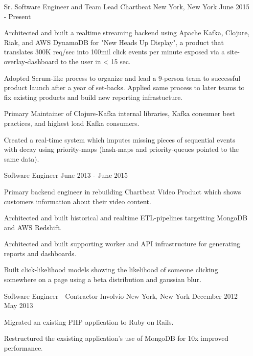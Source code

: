 
\begin{cventries}

	\cventry
	{Sr. Software Engineer and Team Lead}
	{Chartbeat}
	{New York, New York}
	{June 2015 - Present}
	{
		\begin{cvitems}
		\item {Architected and built a realtime streaming backend using Apache Kafka, Clojure, Riak, and AWS DynamoDB for "New Heads Up Display", a product that translates 300K req/sec into 100mil click events per minute exposed via a site-overlay-dashboard to the user in < 15 sec.}
		\item {Adopted Scrum-like process to organize and lead a 9-person team to successful product launch after a year of set-backs. Applied same process to later teams to fix existing products and build new reporting infrastucture.}
		\item {Primary Maintainer of Clojure-Kafka internal libraries, Kafka consumer best practices, and highest load Kafka consumers.}
		\item {Created a real-time system which imputes missing pieces of sequential events with decay using priority-maps (hash-maps and priority-queues pointed to the same data).}
		\end{cvitems}
	}


	\cventry
	{Software Engineer}
	{}
	{}
	{June 2013 - June 2015}
	{
		\begin{cvitems}
		\item {Primary backend engineer in rebuilding Chartbeat Video Product which shows customers information about their video content.}
		\item {Architected and built historical and realtime ETL-pipelines targetting MongoDB and AWS Redshift.}
		\item {Architected and built supporting worker and API infrastructure for generating reports and dashboards.}
		\item {Built click-likelihood models showing the likelihood of someone clicking somewhere on a page using a beta distribution and gaussian blur.}
		\end{cvitems}
	}


	\cventry
	{Software Engineer - Contractor}
	{Involvio}
	{New York, New York}
	{December 2012 - May 2013}
	{
		\begin{cvitems}
		\item {Migrated an existing PHP application to Ruby on Rails.}
		\item {Restructured the exsisting application's use of MongoDB for 10x improved performance.}
		\end{cvitems}
	}


\end{cventries}

